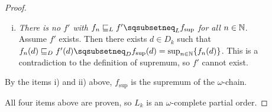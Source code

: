 \begin{lemma}
\begin{proof}
\begin{enumerate}
\begin{enumerate}[i)]
				\item \textit{There is no $f'$ with $f_n \leqL f' \sqsubsetneq_L f_{\sup}$ for all $n \in \mathbb{N}$}. \\
				Assume $f'$ exists.
				Then there exists $d \in D_k$ such that $f_n(d) \leqD f'(d) \sqsubsetneq_D f_{\sup}(d) = \sup_{n \in \N} \{ f_n(d) \}$.
				This is a contradiction to the definition of supremum, so $f'$ cannot exist.
			\end{enumerate}
			By the items i) and ii) above, $f_{\sup}$ is the supremum of the $\omega$-chain.
		\end{enumerate}
		All four items above are proven, so $L_k$ is an $\omega$-complete partial order.
	\end{proof}
\end{lemma}
